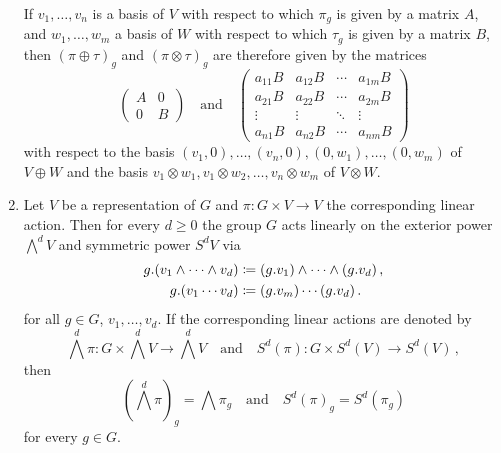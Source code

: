\begin{example}
\begin{enumerate}[label=\alph*)]
      If $v_1, \dotsc, v_n$ is a basis of $V$ with respect to which $\pi_g$ is given by a matrix $A$, and $w_1, \dotsc, w_m$ a basis of $W$ with respect to which $\tau_g$ is given by a matrix $B$, then $(\pi \oplus \tau)_g$ and $(\pi \otimes \tau)_g$ are therefore given by the matrices
      \[
        \begin{pmatrix}
          A & 0 \\
          0 & B
        \end{pmatrix}
        \quad\text{and}\quad
        \begin{pmatrix}
          a_{11} B & a_{12} B & \cdots & a_{1m} B \\
          a_{21} B & a_{22} B & \cdots & a_{2m} B \\
            \vdots  &  \vdots  & \ddots &  \vdots  \\
          a_{n1} B & a_{n2} B & \cdots & a_{nm} B
        \end{pmatrix}
      \]
      with respect to the basis $(v_1,0), \dotsc, (v_n,0), (0,w_1), \dotsc, (0,w_m)$ of $V \oplus W$ and the basis $v_1 \otimes w_1, v_1 \otimes w_2, \dotsc, v_n \otimes w_m$ of $V \otimes W$.
    \item
      Let $V$ be a representation of $G$ and $\pi \colon G \times V \to V$ the corresponding linear action.
      Then for every $d \geq 0$ the group $G$ acts linearly on the exterior power $\bigwedge^d V$ and symmetric power $S^d V$ via
      \begin{align*}
                  g.(v_1 \wedge \dotsb \wedge v_d)
        &\coloneqq (g.v_1) \wedge \dotsb \wedge (g.v_d) \,,
        \\
                  g.(v_1 \dotsm v_d)
        &\coloneqq (g.v_m) \dotsm (g.v_d) \,.
      \end{align*}
      for all $g \in G$, $v_1, \dotsc, v_d$.
      If the corresponding linear actions are denoted by
      \[
        \bigwedge^d \pi \colon G \times \bigwedge^d V \to \bigwedge^d V
        \quad\text{and}\quad
        S^d(\pi) \colon G \times S^d(V) \to S^d(V) \,,
      \]
      then
      \[
          \left( \bigwedge^d \pi \right)_g
        = \bigwedge \pi_g
        \quad\text{and}\quad
          S^d(\pi)_g
        = S^d(\pi_g)
      \]
      for every $g \in G$.
  \end{enumerate}
\end{example}


